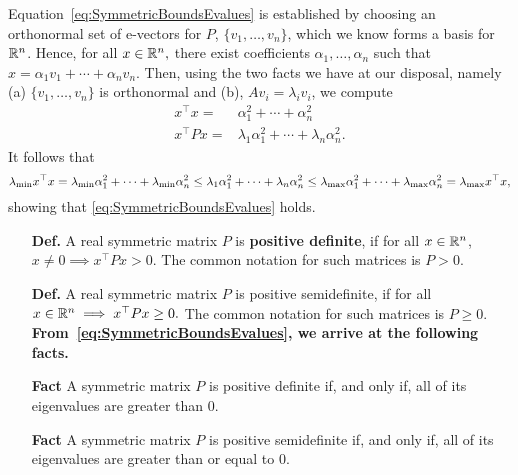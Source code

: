 \vspace*{.2cm}

Equation~\eqref{eq:SymmetricBoundsEvalues} is established by choosing an orthonormal set of e-vectors for $P$, $\{v_1, \ldots, v_n \}$, which we know forms a basis for $\mathbb R^n$. Hence, for all $x\in \mathbb R^n,$ there exist coefficients $\alpha_1, \dots, \alpha_n$ such that $x = \alpha_1 v_1 + \cdots + \alpha_n v_n$. Then, using the two facts we have at our disposal, namely (a) $\{v_1, \ldots, v_n \}$ is orthonormal and (b), $Av_i = \lambda_i v_i$, we compute
\begin{align*}
    x^\top x =& \alpha_1^2 + \cdots + \alpha_n^2\\
      x^\top Px =& \lambda_1 \alpha_1^2 + \cdots + \lambda_n \alpha_n^2.
\end{align*}
It follows that 
$$\lambda_{\rm min} x^\top x =  \lambda_{\rm min} \alpha_1^2 + \cdots + \lambda_{\rm min} \alpha_n^2 \le  \lambda_1 \alpha_1^2 + \cdots + \lambda_n \alpha_n^2 \le \lambda_{\rm max} \alpha_1^2 + \cdots + \lambda_{\rm max}\alpha_n^2 = \lambda_{\rm max} x^\top x, $$
showing that \eqref{eq:SymmetricBoundsEvalues} holds.

\vspace*{.2cm}


\begin{tcolorbox}[sharp corners, colback=green!30, colframe=green!80!blue, title={ \bf \large Positive Definite and Semidefinite Matrices} ]

\begin{enumerate}
    \item[{\bf Def.}]  A real symmetric matrix $P$ is \textbf{positive definite}, if for all $x \in \mathbb R^n$, $x\neq 0 \implies x^\top Px>0.$ The common notation for such matrices is $P > 0.$
    
    \item[{\bf Def.}]  A real symmetric matrix $P$ is positive semidefinite, if for all $x \in \mathbb R^n \implies x^\top Px\ge0.$  The common notation for such matrices is $P \ge 0.$\\
    
 \textbf{ From~\eqref{eq:SymmetricBoundsEvalues}, we arrive at the following facts.}


 \item[{\bf Fact}]   A symmetric matrix $P$ is positive definite if, and only if, all of its eigenvalues are greater than $0$.
 
 
 \item[{\bf Fact}]   A symmetric matrix $P$ is positive semidefinite if, and only if, all of its eigenvalues are greater than or equal to $0$.
 \end{enumerate}
\end{tcolorbox}

